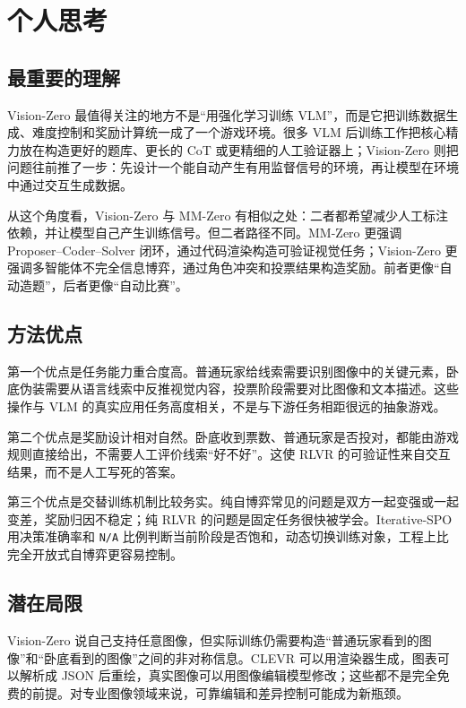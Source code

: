 \section{个人思考}

\subsection{最重要的理解}

Vision-Zero 最值得关注的地方不是“用强化学习训练 VLM”，而是它把训练数据生成、难度控制和奖励计算统一成了一个游戏环境。很多 VLM 后训练工作把核心精力放在构造更好的题库、更长的 CoT 或更精细的人工验证器上；Vision-Zero 则把问题往前推了一步：先设计一个能自动产生有用监督信号的环境，再让模型在环境中通过交互生成数据。

从这个角度看，Vision-Zero 与 MM-Zero 有相似之处：二者都希望减少人工标注依赖，并让模型自己产生训练信号。但二者路径不同。MM-Zero 更强调 Proposer--Coder--Solver 闭环，通过代码渲染构造可验证视觉任务；Vision-Zero 更强调多智能体不完全信息博弈，通过角色冲突和投票结果构造奖励。前者更像“自动造题”，后者更像“自动比赛”。

\subsection{方法优点}

第一个优点是任务能力重合度高。普通玩家给线索需要识别图像中的关键元素，卧底伪装需要从语言线索中反推视觉内容，投票阶段需要对比图像和文本描述。这些操作与 VLM 的真实应用任务高度相关，不是与下游任务相距很远的抽象游戏。

第二个优点是奖励设计相对自然。卧底收到票数、普通玩家是否投对，都能由游戏规则直接给出，不需要人工评价线索“好不好”。这使 RLVR 的可验证性来自交互结果，而不是人工写死的答案。

第三个优点是交替训练机制比较务实。纯自博弈常见的问题是双方一起变强或一起变差，奖励归因不稳定；纯 RLVR 的问题是固定任务很快被学会。Iterative-SPO 用决策准确率和 \texttt{N/A} 比例判断当前阶段是否饱和，动态切换训练对象，工程上比完全开放式自博弈更容易控制。

\subsection{潜在局限}

Vision-Zero 说自己支持任意图像，但实际训练仍需要构造“普通玩家看到的图像”和“卧底看到的图像”之间的非对称信息。CLEVR 可以用渲染器生成，图表可以解析成 JSON 后重绘，真实图像可以用图像编辑模型修改；这些都不是完全免费的前提。对专业图像领域来说，可靠编辑和差异控制可能成为新瓶颈。

